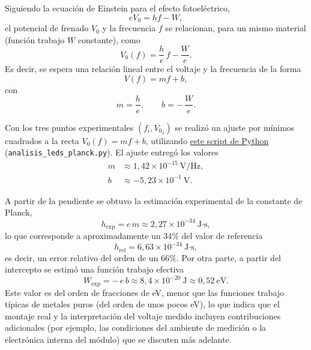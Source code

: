 \documentclass[11pt,twocolumn]{article}
\begin{document}
Siguiendo la ecuación de Einstein para el efecto fotoeléctrico,
\begin{equation*}
    eV_0 = hf - W,
\end{equation*}
el potencial de frenado $V_0$ y la frecuencia $f$ se relacionan, para
un mismo material (función trabajo $W$ constante), como
\begin{equation*}
    V_0(f) = \frac{h}{e}\,f - \frac{W}{e}.
\end{equation*}
Es decir, se espera una relación lineal entre el voltaje y la
frecuencia de la forma
\begin{equation*}
    V(f) = m f + b,
\end{equation*}
con
\begin{equation*}
    m = \frac{h}{e},
    \qquad
    b = -\,\frac{W}{e}.
\end{equation*}

Con los tres puntos
experimentales $(f_i,\overline{V_0}_i)$ se realizó un ajuste por
mínimos cuadrados a la recta $V_0(f) = m f + b$, utilizando
\href{https://udeconce-my.sharepoint.com/:u:/g/personal/jrosas2022_udec_cl/IQAlghGK5KtVSIMtoxaivDERAXu_a-6XY6fiqCMTyiOVOwg?e=nkgkxH}{este script de Python}
(\texttt{analisis\_leds\_planck.py}). El ajuste entregó los valores
\begin{align*}
    m &\approx 1{,}42\times 10^{-15}~\text{V/Hz},
    \\[4pt]
    b &\approx -5{,}23\times 10^{-1}~\text{V}.
\end{align*}

A partir de la pendiente se obtuvo la estimación experimental de la
constante de Planck,
\begin{equation*}
    h_{\text{exp}} = e\,m \approx 2{,}27\times 10^{-34}~\text{J·s},
\end{equation*}
lo que corresponde a aproximadamente un $34\%$ del valor de
referencia
\begin{equation*}
    h_{\text{ref}} = 6{,}63\times 10^{-34}~\text{J·s},
\end{equation*}
es decir, un error relativo del orden de un $66\%$. Por otra parte,
a partir del intercepto se estimó una función trabajo efectiva
\begin{equation*}
    W_{\text{exp}} = -\,e\,b \approx 8{,}4\times 10^{-20}~\text{J}
    \approx 0{,}52~\text{eV}.
\end{equation*}
Este valor es del orden de fracciones de eV, menor que las funciones
trabajo típicas de metales puros (del orden de unos pocos eV), lo que
indica que el montaje real y la interpretación del voltaje medido
incluyen contribuciones adicionales (por ejemplo, las condiciones del ambiente de medición o la electrónica interna
del módulo) que se discuten más adelante.
\end{document}
